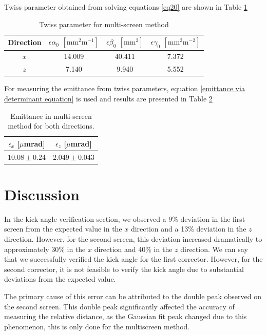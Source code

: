\documentclass[12pt]{article}
\begin{document}
Twiss parameter obtained from solving equations \ref{eq20} are shown in Table \ref{Twiss multi} 


\begin{table}[H]
    \centering
    \begin{tabular}{c|c|c|c}
    \hline
    \hline
        Direction & $\epsilon \alpha_0$ $\mathrm{[mm^2m^{-1}]}$ & $\epsilon \beta_0$ $\mathrm{[mm^2]}$ &$\epsilon \gamma_0$ $\mathrm{[mm^2m^{-2}]}$ \\
         \hline
         $x$ & 14.009 & 40.411 & 7.372 \\
         $z$ & 7.140 & 9.940 & 5.552 \\
    \hline
    \end{tabular}
    \caption{Twiss parameter for multi-screen method}
    \label{Twiss multi}
\end{table}

 For measuring the emittance from twiss parameters, equation \ref{emittance via determinant equation} is used and results are presented in Table \ref{emittance multi}

\begin{table}[H]
    \centering
    \begin{tabular}{c|c}
    \hline
    \hline
          $\epsilon_x$ [$\mu$mrad] & $\epsilon_z $ [$\mu$mrad] \\
    \hline
          $10.08 \pm 0.24$ &  $2.049 \pm 0.043$ \\
    \hline
    
    \end{tabular}
    \caption{Emittance in multi-screen method for both directions.}
    \label{emittance multi}
\end{table}


\section{Discussion}

In the kick angle verification section, we observed a 9\% deviation in the first screen from the expected value in the $x$ direction and a 13\% deviation in the $z$ direction. However, for the second screen, this deviation increased dramatically to approximately 30\% in the $x$ direction and 40\% in the $z$ direction. We can say that we successfully verified the kick angle for the first corrector. However, for the second corrector, it is not feasible to verify the kick angle due to substantial deviations from the expected value.

The primary cause of this error can be attributed to the double peak observed on the second screen. This double peak significantly affected the accuracy of measuring the relative distance, as the Gaussian fit peak changed due to this phenomenon, this is only done for the multiscreen method. 
\end{document}
